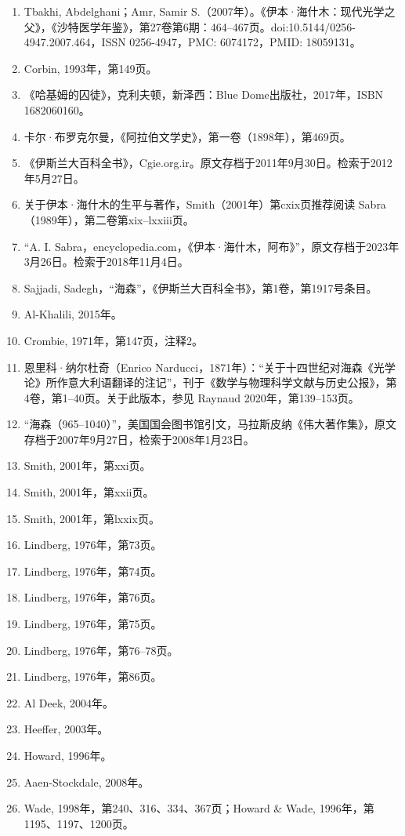 \begin{enumerate}
\item Tbakhi, Abdelghani；Amr, Samir S.（2007年）。《伊本·海什木：现代光学之父》，《沙特医学年鉴》，第27卷第6期：464–467页。doi:10.5144/0256-4947.2007.464，ISSN 0256-4947，PMC: 6074172，PMID: 18059131。
\item Corbin, 1993年，第149页。
\item 《哈基姆的囚徒》，克利夫顿，新泽西：Blue Dome出版社，2017年，ISBN 1682060160。
\item 卡尔·布罗克尔曼，《阿拉伯文学史》，第一卷（1898年），第469页。
\item 《伊斯兰大百科全书》，Cgie.org.ir。原文存档于2011年9月30日。检索于2012年5月27日。
\item 关于伊本·海什木的生平与著作，Smith（2001年）第cxix页推荐阅读 Sabra（1989年），第二卷第xix–lxxiii页。
\item “A. I. Sabra，encyclopedia.com，《伊本·海什木，阿布》”，原文存档于2023年3月26日。检索于2018年11月4日。
\item Sajjadi, Sadegh，“海森”，《伊斯兰大百科全书》，第1卷，第1917号条目。
\item Al-Khalili, 2015年。
\item Crombie, 1971年，第147页，注释2。
\item 恩里科·纳尔杜奇（Enrico Narducci，1871年）：“关于十四世纪对海森《光学论》所作意大利语翻译的注记”，刊于《数学与物理科学文献与历史公报》，第4卷，第1–40页。关于此版本，参见 Raynaud 2020年，第139–153页。
\item “海森（965–1040）”，美国国会图书馆引文，马拉斯皮纳《伟大著作集》，原文存档于2007年9月27日，检索于2008年1月23日。
\item Smith, 2001年，第xxi页。
\item Smith, 2001年，第xxii页。
\item Smith, 2001年，第lxxix页。
\item Lindberg, 1976年，第73页。
\item Lindberg, 1976年，第74页。
\item Lindberg, 1976年，第76页。
\item Lindberg, 1976年，第75页。
\item Lindberg, 1976年，第76–78页。
\item Lindberg, 1976年，第86页。
\item Al Deek, 2004年。
\item Heeffer, 2003年。
\item Howard, 1996年。
\item Aaen-Stockdale, 2008年。
\item Wade, 1998年，第240、316、334、367页；Howard & Wade, 1996年，第1195、1197、1200页。

\end{enumerate}
